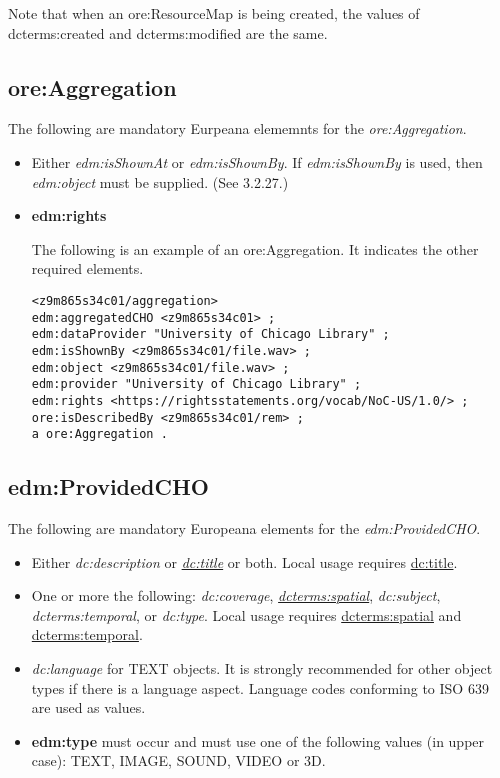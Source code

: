 \documentclass[11pt]{article}
\begin{document}
Note that when an ore:ResourceMap is being created, the values of dcterms:created and dcterms:modified are the same.

\subsection{ore:Aggregation}

The following are mandatory Eurpeana elememnts for the \textit{ore:Aggregation}.

\begin{itemize}

\item Either \textit{edm:isShownAt} or \textit{edm:isShownBy}. If \textit{edm:isShownBy} is used, then \textit{edm:object} must be supplied. (See 3.2.27.)

\item \textbf{edm:rights}

The following is an example of an ore:Aggregation. It indicates the other required elements.

\begin{verbatim}
<z9m865s34c01/aggregation>
edm:aggregatedCHO <z9m865s34c01> ;
edm:dataProvider "University of Chicago Library" ;
edm:isShownBy <z9m865s34c01/file.wav> ;
edm:object <z9m865s34c01/file.wav> ;
edm:provider "University of Chicago Library" ;
edm:rights <https://rightsstatements.org/vocab/NoC-US/1.0/> ;
ore:isDescribedBy <z9m865s34c01/rem> ;
a ore:Aggregation .
\end{verbatim}  

\end{itemize}

\subsection{edm:ProvidedCHO}
The following are mandatory Europeana elements for the \textit{edm:ProvidedCHO}.

\begin{itemize}

  \item Either \textit{dc:description} or \underline{\textit{dc:title}} or both. Local usage requires \underline{dc:title}.

  \item One or more the following: \textit{dc:coverage}, \underline{\textit{dcterms:spatial}}, \textit{dc:subject}, \textit{dcterms:temporal}, or \textit{dc:type}. Local usage requires \underline{dcterms:spatial} and \underline{dcterms:temporal}. 

  \item \textit{dc:language} for TEXT objects. It is strongly recommended for other object types if there is a language aspect. Language codes conforming to ISO 639 are used as values.

  \item \textbf{edm:type} must occur and must use one of the following values (in upper case): TEXT, IMAGE, SOUND, VIDEO or 3D.
\end{itemize}
\end{document}
